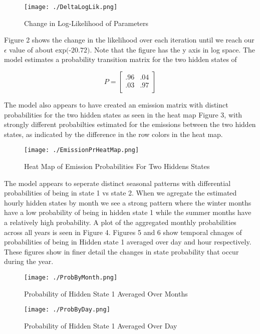 \documentclass{article} %
\begin{document}
\begin{enumerate}
\begin{figure}
  \caption{Change in Log-Likelihood of Parameters}
  \centering
    \texttt{[image: ./DeltaLogLik.png]}
\end{figure}

Figure 2 shows the change in the likelihood over each iteration until we reach
our $\epsilon$ value of about $\text{exp(-20.72)}$. Note that the figure has the
y axis in log space. The model estimates a probability transition matrix for the two
hidden states of

\[
P =
\begin{bmatrix}
    .96 & .04\\
    .03 & .97\\
\end{bmatrix}
\]

The model also appears to have created an emission matrix with distinct
probabilities for the two hidden states as seen in the heat map Figure 3, with
strongly different probabilties estimated for the emissions between the two
hidden states, as indicated by the difference in the row colors in the heat map.


\begin{figure}
  \caption{Heat Map of Emission Probabilities For Two Hiddens States}
  \centering
  \texttt{[image: ./EmissionPrHeatMap.png]}
\end{figure}
The model appears to seperate distinct seasonal patterns with differential
probabilities of being in state 1 vs state 2. When we agregate the estimated
hourly hidden states by month we see a strong pattern where the winter months
have a low probability of being in hidden state 1 while the summer months have
a relatively high probability. A plot of the aggregated monthly probabilities
across all years is seen in Figure 4. Figures 5 and 6 show temporal chnages
of probabilities of being in Hidden state 1 averaged over day and hour
respectively. These figures show in finer detail the changes in state probability
that occur during the year.

\begin{figure}
  \caption{Probability of Hidden State 1 Averaged Over Months}
  \centering
    \texttt{[image: ./ProbByMonth.png]}
\end{figure}

\begin{figure}
  \caption{Probability of Hidden State 1 Averaged Over Day}
  \centering
    \texttt{[image: ./ProbByDay.png]}
\end{figure}


\end{enumerate}
\end{document}

